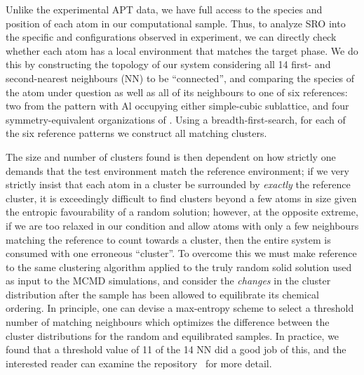 Unlike the experimental APT data, we have full access to the species and position of each atom in our computational sample.
Thus, to analyze SRO into the specific \DOTHREE and \BTWO configurations observed in experiment, we can directly check whether each atom has a local environment that matches the target phase.
We do this by constructing the topology of our system considering all 14 first- and second-nearest neighbours (NN) to be ``connected'', and comparing the species of the atom under question as well as all of its neighbours to one of six references: two from the \BTWO pattern with Al occupying either simple-cubic sublattice, and four symmetry-equivalent organizations of \DOTHREE.
Using a breadth-first-search, for each of the six reference patterns we construct all matching clusters.

The size and number of clusters found is then dependent on how strictly one demands that the test environment match the reference environment;
if we very strictly insist that each atom in a cluster be surrounded by \emph{exactly} the reference cluster, it is exceedingly difficult to find clusters beyond a few atoms in size given the entropic favourability of a random solution;
however, at the opposite extreme, if we are too relaxed in our condition and allow atoms with only a few neighbours matching the reference to count towards a cluster, then the entire system is consumed with one erroneous ``cluster''.
To overcome this we must make reference to the same clustering algorithm applied to the truly random solid solution used as input to the MCMD simulations, and consider the \emph{changes} in the cluster distribution after the sample has been allowed to equilibrate its chemical ordering.
In principle, one can devise a max-entropy scheme to select a threshold number of matching neighbours which optimizes the difference between the cluster distributions for the random and equilibrated samples.
In practice, we found that a threshold value of 11 of the 14 NN did a good job of this, and the interested reader can examine the  repository~\cite{feal} for more detail.

